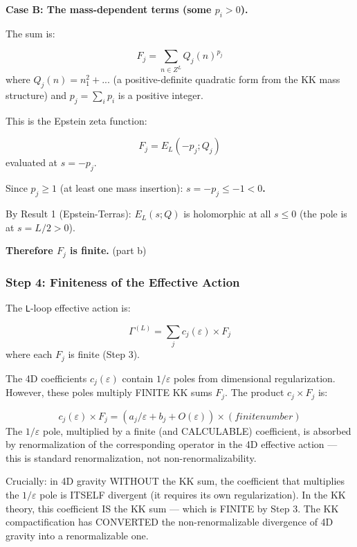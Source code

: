 \documentclass[aps,prd,preprint,superscriptaddress,longbibliography,floatfix]{revtex4-2}
\theoremstyle{remark}
\begin{document}
\textbf{Case B: The mass-dependent terms (some $p_i > 0$).}

The sum is:


\begin{equation}
    F_j = \sum_{n \in Z^L} Q_j(n)^{p_j}
\end{equation}
where $Q_j(n) = n_{1}^{2} + ...$ (a positive-definite quadratic form from the KK mass structure) and $p_j = \sum_i p_i$ is a positive integer.

This is the Epstein zeta function:


\begin{equation}
    F_j = E_L(-p_j; Q_j)
\end{equation}
evaluated at $s = -p_j$.

Since $p_j \geq 1$ (at least one mass insertion): \textbf{$s = -p_j \leq -1 < 0$.}

By Result 1 (Epstein-Terras): $E_L(s; Q)$ is holomorphic at all $s \leq 0$ (the pole is at $s = L/2 > 0$).

\textbf{Therefore $F_j$ is finite.} (part b)


\subsubsection{Step 4: Finiteness of the Effective Action}

The \texttt{L}-loop effective action is:


\begin{equation}
    \Gamma^{(L)} = \sum_j c_j(\varepsilon) \times F_j
\end{equation}
where each $F_j$ is finite (Step 3).

The 4D coefficients $c_j(\varepsilon)$ contain $1/\varepsilon$ poles from dimensional regularization. However, these poles multiply FINITE KK sums $F_j$. The product $c_j \times F_j$ is:


\begin{equation}
    c_j(\varepsilon) \times F_j = (a_j/\varepsilon + b_j + O(\varepsilon)) \times (finite number)
\end{equation}
The $1/\varepsilon$ pole, multiplied by a finite (and CALCULABLE) coefficient, is absorbed by renormalization of the corresponding operator in the 4D effective action --- this is standard renormalization, not non-renormalizability.

Crucially: in 4D gravity WITHOUT the KK sum, the coefficient that multiplies the $1/\varepsilon$ pole is ITSELF divergent (it requires its own regularization). In the KK theory, this coefficient IS the KK sum --- which is FINITE by Step 3. The KK compactification has CONVERTED the non-renormalizable divergence of 4D gravity into a renormalizable one.
\end{document}

